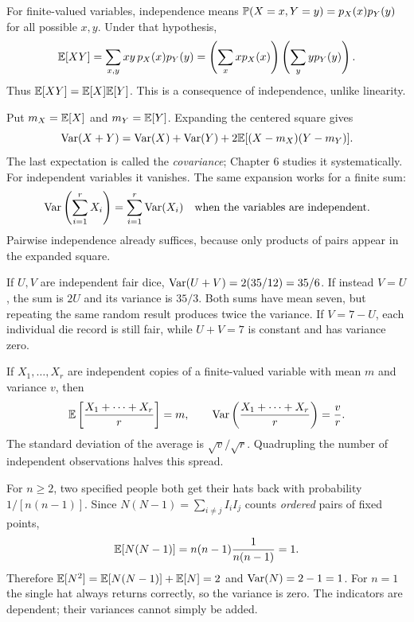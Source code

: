 For finite-valued variables, independence means
$\P(X=x,Y=y)=p_X(x)p_Y(y)$ for all possible $x,y$.
Under that hypothesis,
\[
 \E[XY]=\sum_{x,y}xy\,p_X(x)p_Y(y)
 =\left(\sum_x xp_X(x)\right)\left(\sum_y yp_Y(y)\right).
\]
Thus $\E[XY]=\E[X]\E[Y]$. This is a consequence of independence,
unlike linearity.

Put $m_X=\E[X]$ and $m_Y=\E[Y]$. Expanding the centered square gives
\[
 \Var(X+Y)=\Var(X)+\Var(Y)
       +2\E[(X-m_X)(Y-m_Y)].
\]
The last expectation is called the \emph{covariance}; Chapter 6 studies
it systematically. For independent variables it vanishes. The same
expansion works for a finite sum:
\[
 \Var\left(\sum_{i=1}^r X_i\right)=\sum_{i=1}^r\Var(X_i)
 \quad\text{when the variables are independent.}
\]
Pairwise independence already suffices, because only products of pairs
appear in the expanded square.

\begin{example}
If $U,V$ are independent fair dice, $\Var(U+V)=2(35/12)=35/6$.
If instead $V=U$, the sum is $2U$ and its variance is $35/3$.
Both sums have mean seven, but repeating the same random result
produces twice the variance.
If $V=7-U$, each individual die record is still fair, while $U+V=7$
is constant and has variance zero.
\end{example}

\begin{example}
If $X_1,\ldots,X_r$ are independent copies of a finite-valued variable
with mean $m$ and variance $v$, then
\[
 \E\left[\frac{X_1+\cdots+X_r}{r}\right]=m,\qquad
 \Var\left(\frac{X_1+\cdots+X_r}{r}\right)=\frac{v}{r}.
\]
The standard deviation of the average is $\sqrt v/\sqrt r$.
Quadrupling the number of independent observations halves this spread.
\end{example}

\begin{checkpoint}[title={Return to the hats: variance without the full distribution}]
For $n\ge2$, two specified people both get their hats back with probability
$1/[n(n-1)]$. Since
$N(N-1)=\sum_{i\ne j}I_iI_j$ counts \emph{ordered} pairs of fixed points,
\[
 \E[N(N-1)]=n(n-1)\frac1{n(n-1)}=1.
\]
Therefore $\E[N^2]=\E[N(N-1)]+\E[N]=2$ and $\Var(N)=2-1=1$.
For $n=1$ the single hat always returns correctly, so the variance is zero.
The indicators are dependent; their variances cannot simply be added.
\end{checkpoint}

